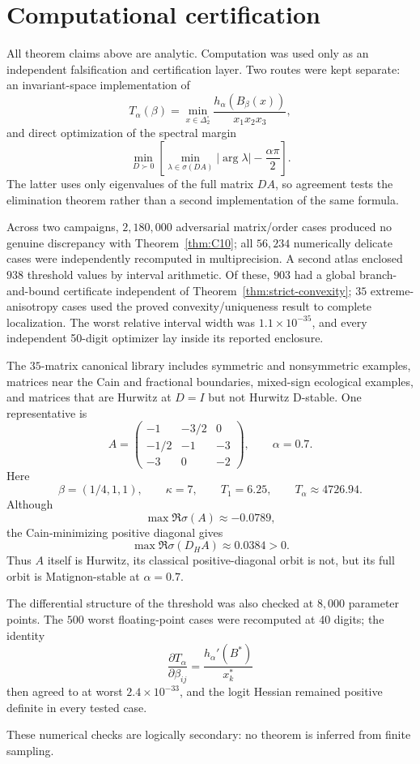 \section{Computational certification}
\label{sec:computation}

All theorem claims above are analytic. Computation was used only as an independent falsification and certification layer. Two routes were kept separate: an invariant-space implementation of
\[
T_\alpha(\beta)
=
\min_{x\in\Delta_2^\circ}
\frac{h_\alpha(B_\beta(x))}{x_1x_2x_3},
\]
and direct optimization of the spectral margin
\[
\min_{D\succ0}
\left[
\min_{\lambda\in\sigma(DA)}
|\arg\lambda|-\frac{\alpha\pi}{2}
\right].
\]
The latter uses only eigenvalues of the full matrix \(DA\), so agreement tests the elimination theorem rather than a second implementation of the same formula.

Across two campaigns, \(2{,}180{,}000\) adversarial matrix/order cases produced no genuine discrepancy with Theorem~\ref{thm:C10}; all \(56{,}234\) numerically delicate cases were independently recomputed in multiprecision. A second atlas enclosed \(938\) threshold values by interval arithmetic. Of these, \(903\) had a global branch-and-bound certificate independent of Theorem~\ref{thm:strict-convexity}; \(35\) extreme-anisotropy cases used the proved convexity/uniqueness result to complete localization. The worst relative interval width was \(1.1\times10^{-35}\), and every independent 50-digit optimizer lay inside its reported enclosure.

The \(35\)-matrix canonical library includes symmetric and nonsymmetric examples, matrices near the Cain and fractional boundaries, mixed-sign ecological examples, and matrices that are Hurwitz at \(D=I\) but not Hurwitz D-stable. One representative is
\[
A=
\begin{pmatrix}
-1&-3/2&0\\
-1/2&-1&-3\\
-3&0&-2
\end{pmatrix},
\qquad
\alpha=0.7.
\]
Here
\[
\beta=(1/4,1,1),
\qquad
\kappa=7,
\qquad
T_1=6.25,
\qquad
T_\alpha\approx4726.94.
\]
Although
\[
\max\Re\sigma(A)\approx-0.0789,
\]
the Cain-minimizing positive diagonal gives
\[
\max\Re\sigma(D_HA)\approx0.0384>0.
\]
Thus \(A\) itself is Hurwitz, its classical positive-diagonal orbit is not, but its full orbit is Matignon-stable at \(\alpha=0.7\).

The differential structure of the threshold was also checked at \(8{,}000\) parameter points. The \(500\) worst floating-point cases were recomputed at 40 digits; the identity
\[
\frac{\partial T_\alpha}{\partial\beta_{ij}}
=
\frac{h_\alpha'(B^*)}{x_k^*}
\]
then agreed to at worst \(2.4\times10^{-33}\), and the logit Hessian remained positive definite in every tested case.

These numerical checks are logically secondary: no theorem is inferred from finite sampling.
